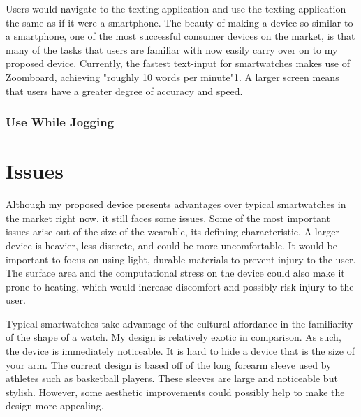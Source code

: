 \documentclass[11pt]{article}
\begin{document}
Users would navigate to the texting application and use the texting application the same as if it were a smartphone. The beauty of making a device so similar to a smartphone, one of the most successful consumer devices on the market, is that many of the tasks that users are familiar with now easily carry over on to my proposed device. Currently, the fastest text-input for smartwatches makes use of Zoomboard, achieving "roughly 10 words per minute"\ref{}. A larger screen means that users have a greater degree of accuracy and speed.

\subsubsection{Use While Jogging}


\section{Issues}

Although my proposed device presents advantages over typical smartwatches in the market right now, it still faces some issues. Some of the most important issues arise out of the size of the wearable, its defining characteristic. A larger device is heavier, less discrete, and could be more uncomfortable. It would be important to focus on using light, durable materials to prevent injury to the user. The surface area and the computational stress on the device could also make it prone to heating, which would increase discomfort and possibly risk injury to the user. 

Typical smartwatches take advantage of the cultural affordance in the familiarity of the shape of a watch. My design is relatively exotic in comparison. As such, the device is immediately noticeable. It is hard to hide a device that is the size of your arm. The current design is based off of the long forearm sleeve used by athletes such as basketball players. These sleeves are large and noticeable but stylish. However, some aesthetic improvements could possibly help to make the design more appealing. 
\end{document}
